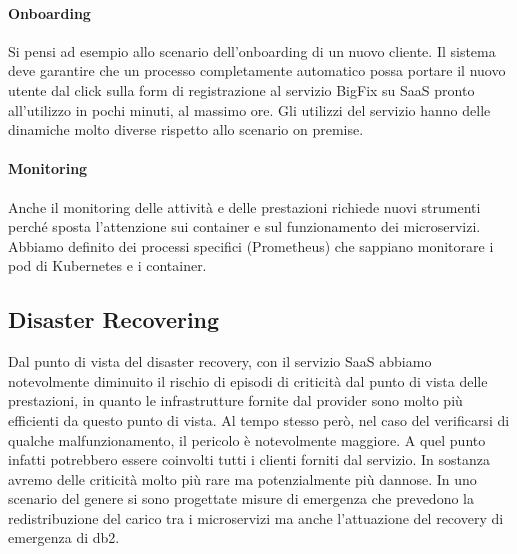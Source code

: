 \paragraph{Onboarding}
Si pensi ad esempio allo scenario dell'onboarding di un nuovo cliente. Il sistema deve garantire che un processo completamente automatico possa portare il nuovo utente dal click sulla form di registrazione al servizio BigFix su SaaS pronto all'utilizzo in pochi minuti, al massimo ore. Gli utilizzi del servizio hanno delle dinamiche molto diverse rispetto allo scenario on premise.

\paragraph{Monitoring}
Anche il monitoring delle attività e delle prestazioni richiede nuovi strumenti perché sposta l'attenzione sui container e sul funzionamento dei microservizi. Abbiamo definito dei processi specifici (Prometheus) che sappiano monitorare i pod di Kubernetes e i container.

\subsection{Disaster Recovering}
Dal punto di vista del disaster recovery, con il servizio SaaS abbiamo notevolmente diminuito il rischio di episodi di criticità dal punto di vista delle prestazioni, in quanto le infrastrutture fornite dal provider sono molto più efficienti da questo punto di vista. Al tempo stesso però, nel caso del verificarsi di qualche malfunzionamento, il pericolo è notevolmente maggiore. A quel punto infatti potrebbero essere coinvolti tutti i clienti forniti dal servizio. In sostanza avremo delle criticità molto più rare ma potenzialmente più dannose. In uno scenario del genere si sono progettate misure di emergenza che prevedono la redistribuzione del carico tra i microservizi ma anche l'attuazione del recovery di emergenza di db2.
